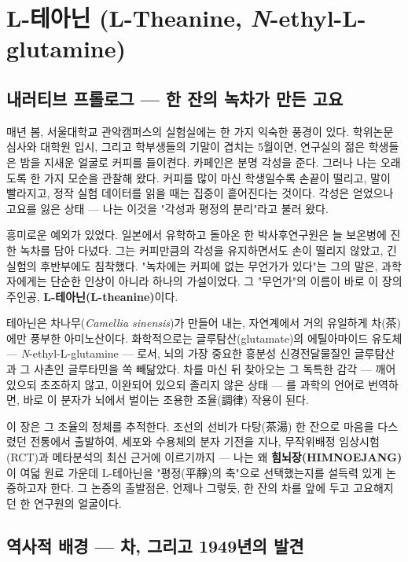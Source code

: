 \documentclass[11pt,oneside]{book}
\begin{document}

\chapter{L-테아닌 (L-Theanine, \textit{N}-ethyl-L-glutamine)}

\section{내러티브 프롤로그 — 한 잔의 녹차가 만든 고요}
매년 봄, 서울대학교 관악캠퍼스의 실험실에는 한 가지 익숙한 풍경이 있다. 학위논문 심사와 대학원 입시, 그리고 학부생들의 기말이 겹치는 5월이면, 연구실의 젊은 학생들은 밤을 지새운 얼굴로 커피를 들이켠다. 카페인은 분명 각성을 준다. 그러나 나는 오래도록 한 가지 모순을 관찰해 왔다. 커피를 많이 마신 학생일수록 손끝이 떨리고, 말이 빨라지고, 정작 실험 데이터를 읽을 때는 집중이 흩어진다는 것이다. 각성은 얻었으나 고요를 잃은 상태 — 나는 이것을 "각성과 평정의 분리"라고 불러 왔다.

흥미로운 예외가 있었다. 일본에서 유학하고 돌아온 한 박사후연구원은 늘 보온병에 진한 녹차를 담아 다녔다. 그는 커피만큼의 각성을 유지하면서도 손이 떨리지 않았고, 긴 실험의 후반부에도 침착했다. "녹차에는 커피에 없는 무언가가 있다"는 그의 말은, 과학자에게는 단순한 인상이 아니라 하나의 가설이었다. 그 "무언가"의 이름이 바로 이 장의 주인공, \textbf{L-테아닌(L-theanine)}이다.

테아닌은 차나무(\textit{Camellia sinensis})가 만들어 내는, 자연계에서 거의 유일하게 차(茶)에만 풍부한 아미노산이다. 화학적으로는 글루탐산(glutamate)의 에틸아마이드 유도체 — \textit{N}-ethyl-L-glutamine — 로서, 뇌의 가장 중요한 흥분성 신경전달물질인 글루탐산과 그 사촌인 글루타민을 쏙 빼닮았다. 차를 마신 뒤 찾아오는 그 독특한 감각 — 깨어 있으되 초조하지 않고, 이완되어 있으되 졸리지 않은 상태 — 를 과학의 언어로 번역하면, 바로 이 분자가 뇌에서 벌이는 조용한 조율(調律) 작용이 된다.

이 장은 그 조율의 정체를 추적한다. 조선의 선비가 다탕(茶湯) 한 잔으로 마음을 다스렸던 전통에서 출발하여, 세포와 수용체의 분자 기전을 지나, 무작위배정 임상시험(RCT)과 메타분석의 최신 근거에 이르기까지 — 나는 왜 \textbf{힘뇌장(HIMNOEJANG)}이 여덟 원료 가운데 L-테아닌을 "평정(平靜)의 축"으로 선택했는지를 설득력 있게 논증하고자 한다. 그 논증의 출발점은, 언제나 그렇듯, 한 잔의 차를 앞에 두고 고요해지던 한 연구원의 얼굴이다.

\section{역사적 배경 — 차, 그리고 1949년의 발견}
\end{document}

